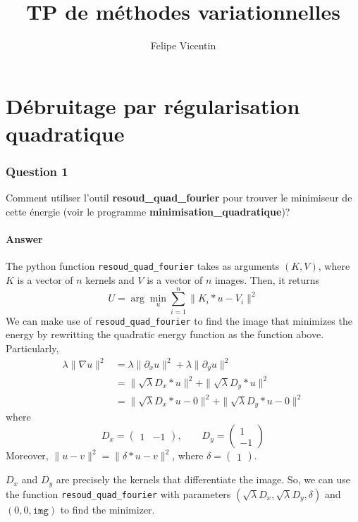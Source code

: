 \documentclass{article}
\title{TP de méthodes variationnelles}
\author{Felipe Vicentin}
\begin{document}
    \maketitle

    \section{Débruitage par régularisation quadratique}

    \subsubsection*{Question 1}
    Comment utiliser l’outil \textbf{resoud\_quad\_fourier} pour trouver le minimiseur de cette énergie (voir le programme \textbf{minimisation\_quadratique})?

    \paragraph{Answer}
    The python function \texttt{resoud\_quad\_fourier} takes as arguments $(K, V)$, where $K$ is a vector of $n$ kernels and $V$ is a vector of $n$ images. Then, it returns
    \[
        U = \arg \min_u \sum_{i = 1}^n \| K_i \ast u - V_i \|^2
    \]
    We can make use of \texttt{resoud\_quad\_fourier} to find the image that minimizes the energy by rewritting the quadratic energy function as the function above.
    Particularly,
    \begin{align*}
        \lambda \| \nabla u \|^2 &= \lambda \| \partial_x u \|^2 + \lambda \| \partial_y u \|^2 \\
        &= \| \sqrt{\lambda} D_x \ast u \|^2 + \| \sqrt{\lambda} D_y \ast u \|^2 \\
        &= \| \sqrt{\lambda} D_x \ast u - 0 \|^2 + \| \sqrt{\lambda} D_y \ast u - 0 \|^2
    \end{align*}
    where
    \[
    D_x = \begin{pmatrix}
    1 & -1
    \end{pmatrix}, \qquad
    D_y = \begin{pmatrix}
    1 \\ -1
    \end{pmatrix}
    \]
    Moreover, $\| u - v \|^2 = \| \delta \ast u - v \|^2$, where $\delta = \begin{pmatrix} 1 \end{pmatrix}$.

    $D_x$ and $D_y$ are precisely the kernels that differentiate the image. So, we can use the function \texttt{resoud\_quad\_fourier} with parameters $(\sqrt{\lambda} D_x, \sqrt{\lambda} D_y, \delta)$ and $(0, 0, \texttt{img})$ to find the minimizer.
\end{document}
